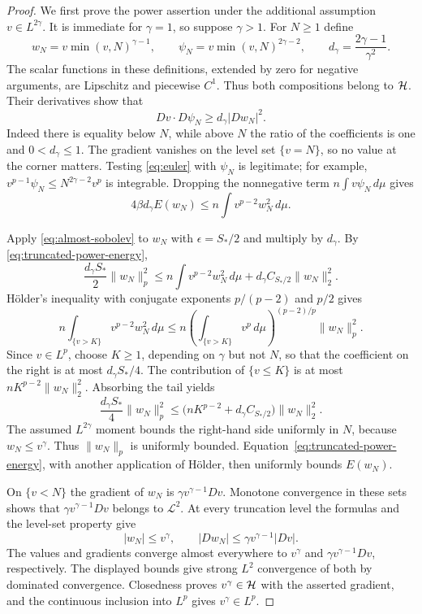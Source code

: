 \begin{proof}
We first prove the power assertion under the additional assumption
$v\in L^{2\gamma}$.  It is immediate for $\gamma=1$, so suppose
$\gamma>1$.  For $N\ge1$ define
\[
 w_N=v\min(v,N)^{\gamma-1},\qquad
 \psi_N=v\min(v,N)^{2\gamma-2},\qquad
 d_\gamma=\frac{2\gamma-1}{\gamma^2}.
\]
The scalar functions in these definitions, extended by zero for
negative arguments, are Lipschitz and piecewise $C^1$.  Thus both
compositions belong to $\mathcal H$.  Their derivatives show that
\[
 Dv\cdot D\psi_N\ge d_\gamma|Dw_N|^2.
\]
Indeed there is equality below $N$, while above $N$ the ratio of
the coefficients is one and $0<d_\gamma\le1$.  The gradient vanishes
on the level set $\{v=N\}$, so no value at the corner matters.
Testing \eqref{eq:euler} with $\psi_N$ is legitimate; for example,
$v^{p-1}\psi_N\le N^{2\gamma-2}v^p$ is integrable.  Dropping the
nonnegative term $n\int v\psi_N\,d\mu$ gives
\begin{equation}
 4\beta d_\gamma E(w_N)
 \le n\int v^{p-2}w_N^2\,d\mu.
 \label{eq:truncated-power-energy}
\end{equation}

Apply \eqref{eq:almost-sobolev} to $w_N$ with $\epsilon=S_*/2$ and
multiply by $d_\gamma$.  By
\eqref{eq:truncated-power-energy},
\[
 \frac{d_\gamma S_*}{2}\|w_N\|_p^2
 \le n\int v^{p-2}w_N^2\,d\mu
       +d_\gamma C_{S_*/2}\|w_N\|_2^2.
\]
H\"older's inequality with conjugate exponents $p/(p-2)$ and $p/2$
gives
\[
 n\int_{\{v>K\}}v^{p-2}w_N^2\,d\mu
 \le n\left(\int_{\{v>K\}}v^p\,d\mu\right)^{(p-2)/p}
       \|w_N\|_p^2.
\]
Since $v\in L^p$, choose $K\ge1$, depending on $\gamma$ but not $N$,
so that the coefficient on the right is at most
$d_\gamma S_*/4$.  The contribution of $\{v\le K\}$ is at most
$nK^{p-2}\|w_N\|_2^2$.  Absorbing the tail yields
\[
 \frac{d_\gamma S_*}{4}\|w_N\|_p^2
 \le\bigl(nK^{p-2}+d_\gamma C_{S_*/2}\bigr)\|w_N\|_2^2.
\]
The assumed $L^{2\gamma}$ moment bounds the right-hand side uniformly
in $N$, because $w_N\le v^\gamma$.  Thus $\|w_N\|_p$ is uniformly
bounded.  Equation~\eqref{eq:truncated-power-energy}, with another
application of H\"older, then uniformly bounds $E(w_N)$.

On $\{v<N\}$ the gradient of $w_N$ is
$\gamma v^{\gamma-1}Dv$.  Monotone convergence in these sets shows
that $\gamma v^{\gamma-1}Dv$ belongs to $\mathcal L^2$.  At every
truncation level the formulas and the level-set property give
\[
 |w_N|\le v^\gamma,\qquad
 |Dw_N|\le\gamma v^{\gamma-1}|Dv|.
\]
The values and gradients converge almost everywhere to $v^\gamma$
and $\gamma v^{\gamma-1}Dv$, respectively.  The displayed bounds
give strong $L^2$ convergence of both by dominated convergence.
Closedness proves $v^\gamma\in\mathcal H$ with the asserted gradient,
and the continuous inclusion into $L^p$ gives $v^\gamma\in L^p$.


\end{proof}
